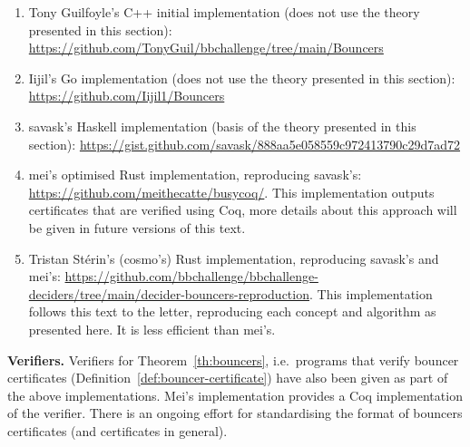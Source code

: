 \begin{enumerate}
    \item Tony Guilfoyle's C++ initial implementation (does not use the theory presented in this section): \url{https://github.com/TonyGuil/bbchallenge/tree/main/Bouncers}
    \item Iijil's Go implementation (does not use the theory presented in this section): \url{https://github.com/Iijil1/Bouncers}
    \item savask's Haskell implementation (basis of the theory presented in this section): \url{https://gist.github.com/savask/888aa5e058559c972413790c29d7ad72}
    \item mei's optimised Rust implementation, reproducing savask's: \url{https://github.com/meithecatte/busycoq/}. This implementation outputs certificates that are verified using Coq, more details about this approach will be given in future versions of this text.
    \item Tristan Stérin's (cosmo's) Rust implementation, reproducing savask's and mei's: \url{https://github.com/bbchallenge/bbchallenge-deciders/tree/main/decider-bouncers-reproduction}. This implementation follows this text to the letter, reproducing each concept and algorithm as presented here. It is less efficient than mei's.


\end{enumerate}


\textbf{Verifiers.} Verifiers for Theorem~\ref{th:bouncers}, i.e.\ programs that verify bouncer certificates (Definition~\ref{def:bouncer-certificate}) have also been given as part of the above implementations. Mei's implementation provides a Coq implementation of the verifier. There is an ongoing effort for standardising the format of bouncers certificates (and certificates in general).


